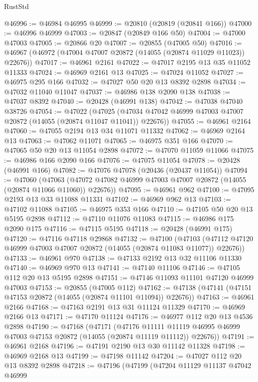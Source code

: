 \begin{lexlean}{RustStd}
\begin{coremodule}
@46996 := @46984 @46995
@46999 := @20810 (@20819 (@20841 @166))
@47000 := @46996 @46999
@47003 := @20847 (@20849 @166 @50)
@47004 := @47000 @47003
@47005 := @20866 @20
@47007 := @20855 (@47005 @50)
@47016 := @46967 (@46972 (@47004 @47007 @20872 (@14055 (@20874 @11029 @11023)) @22676))
@47017 := @46961 @2161
@47022 := @47017 @2195 @13 @35 @11052 @11333
@47024 := @46969 @2161 @13
@47025 := @47024 @11052
@47027 := @46975 @295 @166
@47032 := @47027 @50 @20 @13 @8392 @2898
@47034 := @47032 @11040 @11047
@47037 := @46986 @138 @2090 @138
@47038 := @47037 @8392
@47040 := @20428 (@46991 @138)
@47042 := @47038 @47040 @38726
@47054 := @47022
    (@47025 (@47034 @47042 @46999 @47003 @47007 @20872 (@14055 (@20874 @11047 @11041)) @22676))
@47055 := @46961 @2164
@47060 := @47055 @2194 @13 @34 @11071 @11332
@47062 := @46969 @2164 @13
@47063 := @47062 @11071
@47065 := @46975 @351 @166
@47070 := @47065 @50 @20 @13 @11054 @2898
@47072 := @47070 @11059 @11066
@47075 := @46986 @166 @2090 @166
@47076 := @47075 @11054
@47078 := @20428 (@46991 @166)
@47082 := @47076 @47078 (@20436 (@20437 @11054))
@47094 := @47060
    (@47063 (@47072 @47082 @46999 @47003 @47007 @20872 (@14055 (@20874 @11066 @11060)) @22676))
@47095 := @46961 @962
@47100 := @47095 @2193 @13 @33 @11088 @11331
@47102 := @46969 @962 @13
@47103 := @47102 @11088
@47105 := @46975 @353 @166
@47110 := @47105 @50 @20 @13 @5195 @2898
@47112 := @47110 @11076 @11083
@47115 := @46986 @175 @2090 @175
@47116 := @47115 @5195
@47118 := @20428 (@46991 @175)
@47120 := @47116 @47118 @29868
@47132 := @47100
    (@47103 (@47112 @47120 @46999 @47003 @47007 @20872 (@14055 (@20874 @11083 @11077)) @22676))
@47133 := @46961 @970
@47138 := @47133 @2192 @13 @32 @11106 @11330
@47140 := @46969 @970 @13
@47141 := @47140 @11106
@47146 := @47105 @112 @20 @13 @5195 @2898
@47151 := @47146 @11093 @11101 @47120 @46999 @47003
@47153 := @20855 (@47005 @112)
@47162 := @47138 (@47141 (@47151 @47153 @20872 (@14055 (@20874 @11101 @11094)) @22676))
@47163 := @46961 @2166
@47168 := @47163 @2191 @13 @31 @11124 @11329
@47170 := @46969 @2166 @13
@47171 := @47170 @11124
@47176 := @46977 @112 @20 @13 @4536 @2898
@47190 := @47168
    (@47171
      (@47176
        @11111
        @11119
        @46995
        @46999
        @47003
        @47153
        @20872
        (@14055 (@20874 @11119 @11112))
        @22676))
@47191 := @46961 @2168
@47196 := @47191 @2190 @13 @30 @11142 @11328
@47198 := @46969 @2168 @13
@47199 := @47198 @11142
@47204 := @47027 @112 @20 @13 @8392 @2898
@47218 := @47196
    (@47199
      (@47204
        @11129
        @11137
        @47042
        @46999

\end{coremodule}
\end{lexlean}
